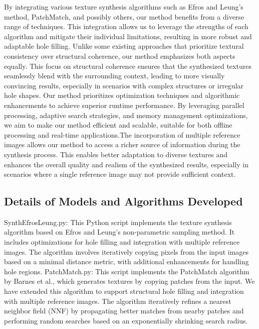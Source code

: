 \begin{methods}
By integrating various texture synthesis algorithms such as Efros and Leung's method, PatchMatch, and possibly others, our method benefits from a diverse range of techniques. This integration allows us to leverage the strengths of each algorithm and mitigate their individual limitations, resulting in more robust and adaptable hole filling. Unlike some existing approaches that prioritize textural consistency over structural coherence, our method emphasizes both aspects equally. This focus on structural coherence ensures that the synthesized textures seamlessly blend with the surrounding context, leading to more visually convincing results, especially in scenarios with complex structures or irregular hole shapes.
Our method prioritizes optimization techniques and algorithmic enhancements to achieve superior runtime performance. By leveraging parallel processing, adaptive search strategies, and memory management optimizations, we aim to make our method efficient and scalable, suitable for both offline processing and real-time applications.The incorporation of multiple reference images allows our method to access a richer source of information during the synthesis process. This enables better adaptation to diverse textures and enhances the overall quality and realism of the synthesized results, especially in scenarios where a single reference image may not provide sufficient context.

\subsection{Details of Models and Algorithms Developed}

SynthEfrosLeung.py: This Python script implements the texture synthesis algorithm based on Efros and Leung's non-parametric sampling method. It includes optimizations for hole filling and integration with multiple reference images. The algorithm involves iteratively copying pixels from the input images based on a minimal distance metric, with additional enhancements for handling hole regions.
PatchMatch.py: This script implements the PatchMatch algorithm by Barnes et al., which generates textures by copying patches from the input. We have extended this algorithm to support structural hole filling and integration with multiple reference images. The algorithm iteratively refines a nearest neighbor field (NNF) by propagating better matches from nearby patches and performing random searches based on an exponentially shrinking search radius.


\end{methods}
